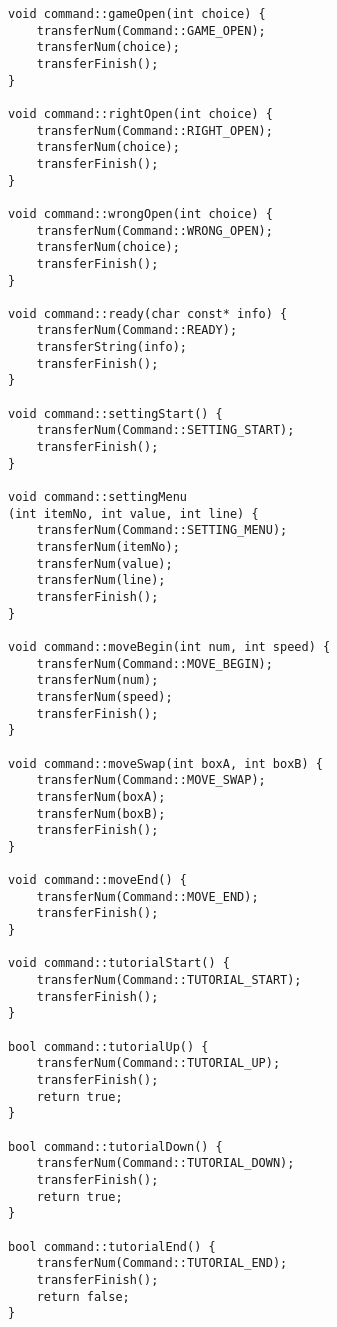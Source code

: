 \begin{verbatim}
void command::gameOpen(int choice) {
    transferNum(Command::GAME_OPEN);
    transferNum(choice);
    transferFinish();
}

void command::rightOpen(int choice) {
    transferNum(Command::RIGHT_OPEN);
    transferNum(choice);
    transferFinish();
}

void command::wrongOpen(int choice) {
    transferNum(Command::WRONG_OPEN);
    transferNum(choice);
    transferFinish();
}

void command::ready(char const* info) {
    transferNum(Command::READY);
    transferString(info);
    transferFinish();
}

void command::settingStart() {
    transferNum(Command::SETTING_START);
    transferFinish();
}

void command::settingMenu
(int itemNo, int value, int line) {
    transferNum(Command::SETTING_MENU);
    transferNum(itemNo);
    transferNum(value);
    transferNum(line);
    transferFinish();
}

void command::moveBegin(int num, int speed) {
    transferNum(Command::MOVE_BEGIN);
    transferNum(num);
    transferNum(speed);
    transferFinish();
}

void command::moveSwap(int boxA, int boxB) {
    transferNum(Command::MOVE_SWAP);
    transferNum(boxA);
    transferNum(boxB);
    transferFinish();
}

void command::moveEnd() {
    transferNum(Command::MOVE_END);
    transferFinish();
}

void command::tutorialStart() {
    transferNum(Command::TUTORIAL_START);
    transferFinish();
}

bool command::tutorialUp() {
    transferNum(Command::TUTORIAL_UP);
    transferFinish();
    return true;
}

bool command::tutorialDown() {
    transferNum(Command::TUTORIAL_DOWN);
    transferFinish();
    return true;
}

bool command::tutorialEnd() {
    transferNum(Command::TUTORIAL_END);
    transferFinish();
    return false;
}


\end{verbatim}
